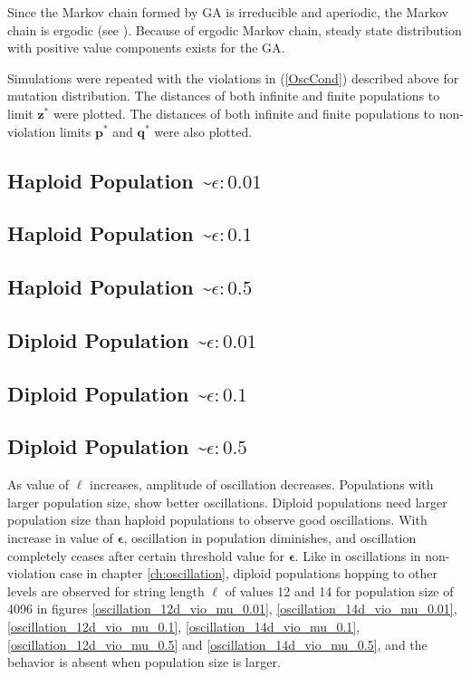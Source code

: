 Since the Markov chain formed by GA is irreducible and aperiodic, 
the Markov chain is ergodic (see \cite{MarkovChain}). Because of ergodic Markov chain, 
steady state distribution with positive value components exists for the GA.   

Simulations were repeated with the violations in (\ref{OscCond}) described above for mutation distribution.
The distances of both infinite and finite populations to limit $\bm{z}^\ast$ were plotted. 
The distances of both infinite and finite populations to non-violation limits $\bm{p}^\ast$ and $\bm{q}^\ast$ were also plotted.

\subsection{Haploid Population \textasciitilde $\epsilon: 0.01$}

\subsection{Haploid Population \textasciitilde $\epsilon: 0.1$}

\subsection{Haploid Population \textasciitilde $\epsilon: 0.5$}


\subsection{Diploid Population \textasciitilde $\epsilon: 0.01$}

\subsection{Diploid Population \textasciitilde $\epsilon: 0.1$}

\subsection{Diploid Population \textasciitilde $\epsilon: 0.5$}


As value of $\ell$ increases, amplitude of oscillation decreases. 
Populations with larger population size, show better oscillations. 
Diploid populations need larger population size than haploid populations to observe good oscillations.
With increase in value of $\bm{\epsilon}$, 
oscillation in population diminishes, and oscillation completely ceases 
after certain threshold value for $\bm{\epsilon}$. 
Like in oscillations in non-violation case in chapter \ref{ch:oscillation}, diploid populations hopping to other levels 
are observed for string length $\ell$ of values 12 and 14 for population size of 4096 in 
figures \ref{oscillation_12d_vio_mu_0.01}, \ref{oscillation_14d_vio_mu_0.01}, \ref{oscillation_12d_vio_mu_0.1}, 
\ref{oscillation_14d_vio_mu_0.1}, \ref{oscillation_12d_vio_mu_0.5} and \ref{oscillation_14d_vio_mu_0.5}, 
and the behavior is absent when population size is larger.

